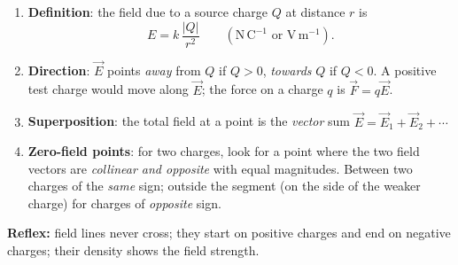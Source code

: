 \documentclass[11pt]{article}
\begin{document}
\begin{methode}
\begin{enumerate}
\item \textbf{Definition}: the field due to a source charge $Q$ at distance $r$ is
\[ E = k\,\frac{|Q|}{r^2} \qquad (\mathrm{N\,C^{-1}} \text{ or } \mathrm{V\,m^{-1}}). \]
\item \textbf{Direction}: $\vec{E}$ points \emph{away} from $Q$ if $Q > 0$, \emph{towards} $Q$ if $Q < 0$. A positive test charge would move along $\vec{E}$; the force on a charge $q$ is $\vec{F} = q\vec{E}$.
\item \textbf{Superposition}: the total field at a point is the \emph{vector} sum $\vec{E} = \vec{E}_1 + \vec{E}_2 + \cdots$
\item \textbf{Zero-field points}: for two charges, look for a point where the two field vectors are \emph{collinear and opposite} with equal magnitudes. Between two charges of the \emph{same} sign; outside the segment (on the side of the weaker charge) for charges of \emph{opposite} sign.
\end{enumerate}
\textbf{Reflex:} field lines never cross; they start on positive charges and end on negative charges; their density shows the field strength.
\end{methode}
\end{document}

